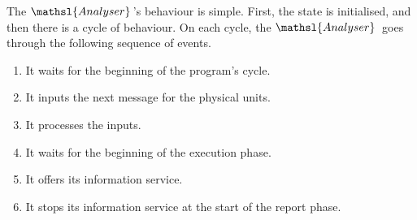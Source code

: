 \documentclass{report}
\newcommand{\compresslist}{\itemsep=0pt \parskip=0pt}
\begin{document}
The \( \mathsl{Analyser} \, \)'s behaviour is simple.  First, the
state is initialised, and then there is a cycle of behaviour.  On each
cycle, the \( \mathsl{Analyser} \, \)\/ goes through the following
sequence of events.
\begin{enumerate}\compresslist
\item It waits for the beginning of the program's cycle.
\item It inputs the next message for the physical units.
\item It processes the inputs.
\item It waits for the beginning of the execution phase.
\item It offers its information service.
\item It stops its information service at the start of the report
  phase.
\end{enumerate}
\end{document}
